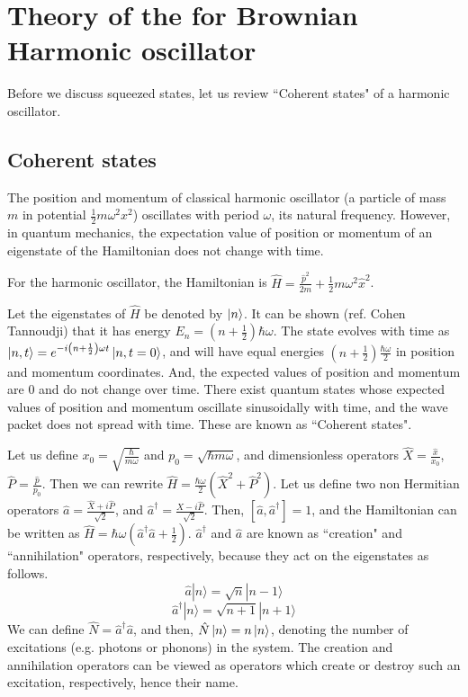 \documentclass[12pt, twoside]{article}
\begin{document}
\section{Theory of the for Brownian Harmonic oscillator}

Before we discuss squeezed states, let us review ``Coherent states" of a harmonic oscillator.
\subsection{Coherent states}
The position and momentum of classical harmonic oscillator (a particle of mass $m$ in potential $\frac{1}{2}m\omega^2x^2$)  oscillates with period $\omega$, its natural frequency.
However, in quantum mechanics, the expectation value of position or momentum of an eigenstate of the Hamiltonian does not change with time.


For the harmonic oscillator, the Hamiltonian is $\hat{H} = \frac{\hat{p}^2}{2m} + \frac{1}{2}m \omega^2 {\hat{x}}^2$.


Let the eigenstates of $\hat{H}$ be denoted by $\ket{n}$. It can be shown (ref. Cohen Tannoudji) that it has energy $E_n = (n+\frac{1}{2}) \hbar\omega$. The state evolves with time as $\ket{n,t} = e ^ { -i \left( n + \frac { 1 } { 2 } \right) \omega t } \ket{n,t=0}$, and will have equal energies $(n+\frac{1}{2}) \frac{\hbar\omega}{2}$ in position and momentum coordinates. And, the expected values of position and momentum are $0$ and do not change over time.
There exist quantum states whose expected values of position and momentum oscillate sinusoidally with time, and the wave packet does not spread with time. These are known as ``Coherent states".


Let us define $x_0 = \sqrt{\frac{\hbar}{m\omega}}$ and $p_0 = \sqrt{\hbar m \omega}$, and dimensionless operators $\hat{X} = \frac{\hat{x}}{x_0}$,$\hat{P} = \frac{\hat{p}}{p_0}$. Then we can rewrite $\hat{H} = \frac{\hbar\omega}{2}({\hat{X}}^2 + {\hat{P}}^2)$. Let us define two non Hermitian operators $\hat{a} = \frac{\hat{X} + i \hat{P}}{\sqrt{2}}$, and ${\hat{a}}^\dagger = \frac{\hat{X} - i \hat{P}}{\sqrt{2}}$. Then, $[\hat{a},\hat{a}^\dagger] = 1$, and the Hamiltonian can be written as $\hat{H} = \hbar\omega( \hat{a}^\dagger \hat{a} + \frac{1}{2})$.
$\hat{a}^\dagger$ and $\hat{a}$ are known as ``creation" and ``annihilation" operators, respectively, because they act on the eigenstates as follows. 
\begin{equation}\label{eq:a} { \hat{a} | n \rangle = \sqrt { n } | n - 1 \rangle } \end{equation}
\begin{equation} \label{eq:adagger}{ \hat{a} ^ { \dagger } | n \rangle = \sqrt { n + 1 } | n + 1 \rangle }\end{equation} 
We can define $\hat{N} = \hat{a}^\dagger\hat{a}$, and then, $\hat{N} \ket{n} = n\ket{n}$, denoting the number of excitations (e.g. photons or phonons) in the system. The creation and annihilation operators can be viewed as operators which create or destroy such an excitation, respectively, hence their name.
\end{document}
